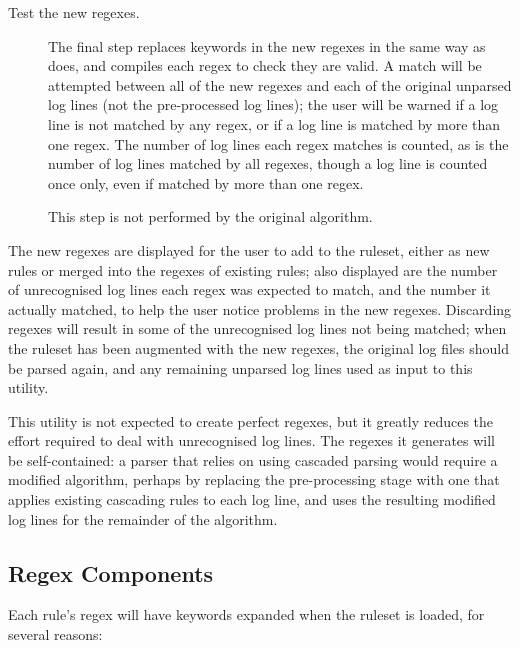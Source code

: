 \begin{description}
    \item [Test the new regexes.]  The final step replaces keywords in the
        new regexes in the same way as \parsername{} does, and compiles
        each regex to check they are valid.  A match will be attempted
        between all of the new regexes and each of the original unparsed
        log lines (not the pre-processed log lines); the user will be
        warned if a log line is not matched by any regex, or if a log line
        is matched by more than one regex.  The number of log lines each
        regex matches is counted, as is the number of log lines matched by
        all regexes, though a log line is counted once only, even if
        matched by more than one regex.

        This step is not performed by the original algorithm.

\end{description}

The new regexes are displayed for the user to add to the ruleset, either as
new rules or merged into the regexes of existing rules; also displayed are
the number of unrecognised log lines each regex was expected to match, and
the number it actually matched, to help the user notice problems in the new
regexes.  Discarding regexes will result in some of the unrecognised log
lines not being matched; when the ruleset has been augmented with the new
regexes, the original log files should be parsed again, and any remaining
unparsed log lines used as input to this utility.

This utility is not expected to create perfect regexes, but it greatly
reduces the effort required to deal with unrecognised log lines.  The
regexes it generates will be self-contained: a parser that relies on using
cascaded parsing would require a modified algorithm, perhaps by replacing
the pre-processing stage with one that applies existing cascading rules to
each log line, and uses the resulting modified log lines for the remainder
of the algorithm.

\subsection{Regex Components}

\label{regex components}

Each rule's regex will have keywords expanded when the ruleset is loaded,
for several reasons:

